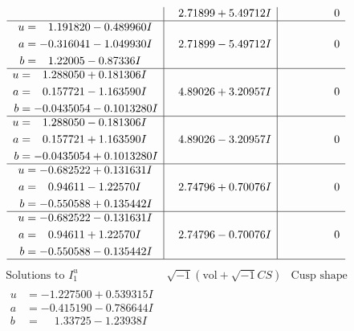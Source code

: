 \documentclass[1p]{elsarticle_modified}
\theoremstyle{definition}
\newcommand{\I}{\sqrt{-1}}
\begin{document}
$$\begin{array}{c|c|c}
 & \phantom{-}2.71899 + 5.49712 I & \phantom{-0.000000 } 0 \\ \hline\begin{aligned}
u &= \phantom{-}1.191820 - 0.489960 I \\
a &= -0.316041 - 1.049930 I \\
b &= \phantom{-}1.22005 - 0.87336 I\end{aligned}
 & \phantom{-}2.71899 - 5.49712 I & \phantom{-0.000000 } 0 \\ \hline\begin{aligned}
u &= \phantom{-}1.288050 + 0.181306 I \\
a &= \phantom{-}0.157721 - 1.163590 I \\
b &= -0.0435054 - 0.1013280 I\end{aligned}
 & \phantom{-}4.89026 + 3.20957 I & \phantom{-0.000000 } 0 \\ \hline\begin{aligned}
u &= \phantom{-}1.288050 - 0.181306 I \\
a &= \phantom{-}0.157721 + 1.163590 I \\
b &= -0.0435054 + 0.1013280 I\end{aligned}
 & \phantom{-}4.89026 - 3.20957 I & \phantom{-0.000000 } 0 \\ \hline\begin{aligned}
u &= -0.682522 + 0.131631 I \\
a &= \phantom{-}0.94611 - 1.22570 I \\
b &= -0.550588 + 0.135442 I\end{aligned}
 & \phantom{-}2.74796 + 0.70076 I & \phantom{-0.000000 } 0 \\ \hline\begin{aligned}
u &= -0.682522 - 0.131631 I \\
a &= \phantom{-}0.94611 + 1.22570 I \\
b &= -0.550588 - 0.135442 I\end{aligned}
 & \phantom{-}2.74796 - 0.70076 I & \phantom{-0.000000 } 0\\
 \hline 
 \end{array}$$\newpage$$\begin{array}{c|c|c}  
\text{Solutions to }I^u_{1}& \I (\text{vol} + \sqrt{-1}CS) & \text{Cusp shape}\\
 \hline 
\begin{aligned}
u &= -1.227500 + 0.539315 I \\
a &= -0.415190 - 0.786644 I \\
b &= \phantom{-}1.33725 - 1.23938 I\end{aligned}

\end{array}$$
\end{document}
